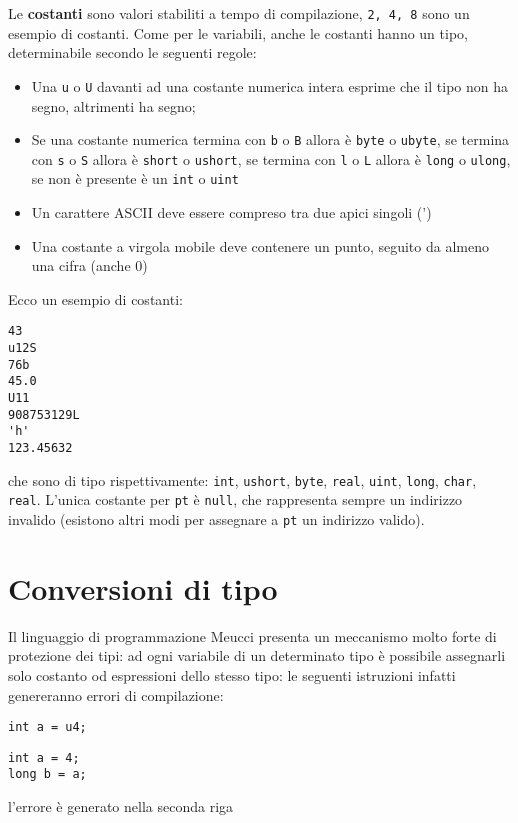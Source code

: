 \documentclass[10pt]{book}%
\newcommand{\e}{\`{e} }
\newcommand{\code}[1]{\texttt{#1}}
\renewcommand{\emph}[1]{\textbf{#1}}
\newenvironment{codeenv}{
\begin{mdframed}[backgroundcolor=black!20,topline=false,leftline=false,rightline=false,bottomline=false]
}
{\end{mdframed}}
\begin{document}
Le \emph{costanti} sono valori stabiliti a tempo di compilazione, \code{2, 4, 8} sono un esempio di costanti. Come per le variabili, anche le costanti hanno un tipo, determinabile secondo le seguenti regole:
\begin{itemize}
\item Una \code{u} o \code U davanti ad una costante numerica intera esprime che il tipo non ha segno, altrimenti ha segno;
\item Se una costante numerica termina con \code b o \code B allora \e \code{byte} o \code{ubyte}, se termina con \code s o \code S allora \e \code{short} o \code{ushort}, se termina con \code l o \code L allora \e \code{long} o \code{ulong}, se non \e presente \e un \code{int} o \code{uint}
\item Un carattere ASCII deve essere compreso tra due apici singoli (')
\item Una costante a virgola mobile deve contenere un punto, seguito da almeno una cifra (anche 0) 
\end{itemize}
Ecco un esempio di costanti:

\begin{codeenv}
\begin{verbatim}
43
u12S
76b
45.0
U11
908753129L
'h'
123.45632
\end{verbatim}
\end{codeenv}
che sono di tipo rispettivamente: \code{int}, \code{ushort}, \code{byte}, \code{real}, \code{uint}, \code{long}, \code{char}, \code{real}. L'unica costante per \code{pt} \e \code{null}, che rappresenta sempre un indirizzo invalido (esistono altri modi per assegnare a \code{pt} un indirizzo valido).

\section{Conversioni di tipo}
Il linguaggio di programmazione Meucci presenta un meccanismo molto forte di protezione dei tipi: ad ogni variabile di un determinato tipo \e possibile assegnarli solo costanto od espressioni dello stesso tipo: le seguenti istruzioni infatti genereranno errori di compilazione:
\begin{codeenv}
\begin{verbatim}
int a = u4;
\end{verbatim}
\end{codeenv}

\begin{codeenv}
\begin{verbatim}
int a = 4;
long b = a;
\end{verbatim}
\end{codeenv}
l'errore \e generato nella seconda riga
\end{document}
